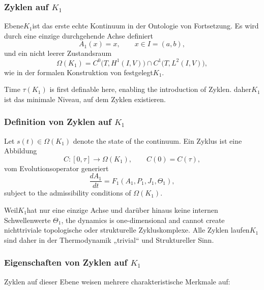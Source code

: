 
\subsubsection{Zyklen auf \texorpdfstring{$K_1$}{K_1}}
\label{sec:cycles-k1}

Ebene$K_1$ist das erste echte Kontinuum in der Ontologie von
Fortsetzung.
Es wird durch eine einzige durchgehende Achse definiert
\[
  A_1(x)=x, \qquad x\in I=(a,b),
\]
und ein nicht leerer Zustandsraum
\[
  \Omega(K_1)
  = C^0\!\bigl(T, H^1(I,V)\bigr)
    \cap C^1\!\bigl(T, L^2(I,V)\bigr),
\]
wie in der formalen Konstruktion von festgelegt$K_1$.

Time $\tau(K_1)$ is first definable here, enabling the introduction of
Zyklen.
daher$K_1$ist das minimale Niveau, auf dem Zyklen existieren.

\subsubsection{Definition von Zyklen auf \texorpdfstring{$K_1$}{K_1}}

Let $s(t)\in\Omega(K_1)$ denote the state of the continuum.  
Ein Zyklus ist eine Abbildung
\[
  C:[0,\tau]\to\Omega(K_1), \qquad
  C(0)=C(\tau),
\]
vom Evolutionsoperator generiert
\[
  \frac{dA_1}{dt} = F_1(A_1,P_1,J_1,\Theta_1),
\]
subject to the admissibility conditions of $\Omega(K_1)$.

Weil$K_1$hat nur eine einzige Achse und darüber hinaus keine internen Schwellenwerte
$\Theta_1$, the dynamics is one-dimensional and cannot create
nichttriviale topologische oder strukturelle Zykluskomplexe.
Alle Zyklen laufen$K_1$sind daher in der Thermodynamik „trivial“ und
Struktureller Sinn.

\subsubsection{Eigenschaften von Zyklen auf \texorpdfstring{$K_1$}{K_1}}

Zyklen auf dieser Ebene weisen mehrere charakteristische Merkmale auf:

